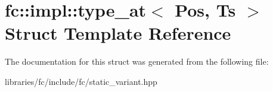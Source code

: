 \hypertarget{structfc_1_1impl_1_1type__at}{}\section{fc\+:\+:impl\+:\+:type\+\_\+at$<$ Pos, Ts $>$ Struct Template Reference}
\label{structfc_1_1impl_1_1type__at}


The documentation for this struct was generated from the following file\+:\begin{DoxyCompactItemize}
\item 
libraries/fc/include/fc/static\+\_\+variant.\+hpp\end{DoxyCompactItemize}
